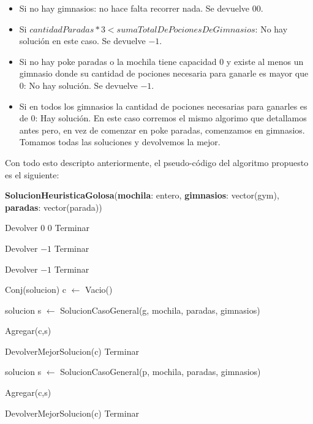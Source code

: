 \begin{itemize}

\item Si no hay gimnasios: no hace falta recorrer nada. Se devuelve $0 0$.

\item Si $cantidadParadas*3 < sumaTotalDePocionesDeGimnasios$: No hay solución en este caso. Se devuelve $-1$.

\item Si no hay poke paradas o la mochila tiene capacidad $0$ y existe al menos un gimnasio donde su cantidad de pociones necesaria para ganarle es mayor que $0$: No hay solución. Se devuelve $-1$.

\item Si en todos los gimnasios la cantidad de pociones necesarias para ganarles es de $0$: Hay solución. En este caso corremos el mismo algorimo que detallamos antes pero, en vez de comenzar en poke paradas, comenzamos en gimnasios. Tomamos todas las soluciones y devolvemos la mejor.

\end{itemize}

Con todo esto descripto anteriormente, el pseudo-código del algoritmo propuesto es el siguiente:

\begin{algorithm}[H]
\label{}
\caption{\textbf{SolucionHeuristicaGolosa}(\textbf{mochila}: entero, \textbf{gimnasios}: vector(gym), \textbf{paradas}: vector(parada))}
\begin{algorithmic}[1]

	\State Devolver $0$ $0$
	\State Terminar
\EndIf

	\State Devolver $-1$
	\State Terminar
\EndIf

	\State Devolver $-1$
	\State Terminar
\EndIf

\State Conj(solucion) c $\leftarrow$ Vacio()




		\State solucion s $\leftarrow$ SolucionCasoGeneral(g, mochila, paradas, gimnasios)

		\State Agregar(c,s)

	\EndFor

	\State DevolverMejorSolucion(c)
	\State Terminar
\Else


		\State solucion s $\leftarrow$ SolucionCasoGeneral(p, mochila, paradas, gimnasios)

		\State Agregar(c,s)

	\EndFor

\EndIf

\State DevolverMejorSolucion(c)
\State Terminar

\medskip
\Statex \underline{}
\end{algorithmic}
\end{algorithm}

